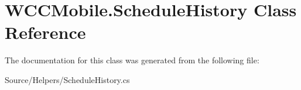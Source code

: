 \hypertarget{class_w_c_c_mobile_1_1_schedule_history}{}\section{W\+C\+C\+Mobile.\+Schedule\+History Class Reference}
\label{class_w_c_c_mobile_1_1_schedule_history}


The documentation for this class was generated from the following file\+:\begin{DoxyCompactItemize}
\item 
Source/\+Helpers/Schedule\+History.\+cs\end{DoxyCompactItemize}

